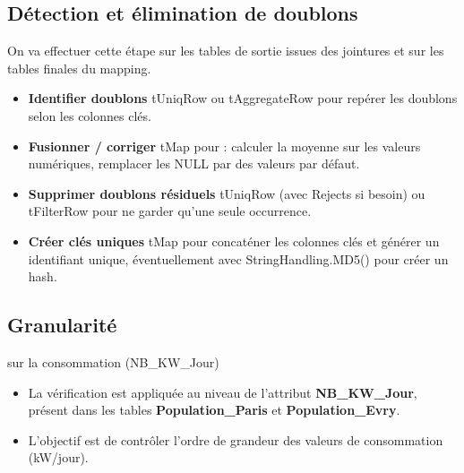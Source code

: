 \begin{itemize}
\end{itemize} \subsection{Détection et élimination de doublons} On va effectuer cette étape sur les tables de sortie issues des jointures et sur les tables finales du mapping. \begin{itemize} \item \textbf{Identifier doublons} tUniqRow ou tAggregateRow pour repérer les doublons selon les colonnes clés. \item \textbf{Fusionner / corriger} tMap pour : calculer la moyenne sur les valeurs numériques, remplacer les NULL par des valeurs par défaut. \item \textbf{Supprimer doublons résiduels} tUniqRow (avec Rejects si besoin) ou tFilterRow pour ne garder qu'une seule occurrence. \item \textbf{Créer clés uniques} tMap pour concaténer les colonnes clés et générer un identifiant unique, éventuellement avec StringHandling.MD5() pour créer un hash. \end{itemize} \subsection{Granularité} sur la consommation (NB\_KW\_Jour) \begin{itemize} \item La vérification est appliquée au niveau de l'attribut \textbf{NB\_KW\_Jour}, présent dans les tables \textbf{Population\_Paris} et \textbf{Population\_Evry}. \item L'objectif est de contrôler l'ordre de grandeur des valeurs de consommation (kW/jour). \end{itemize} 